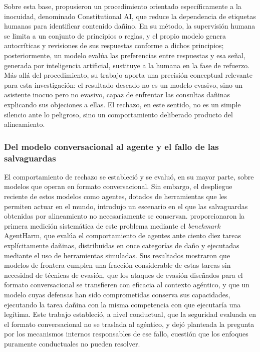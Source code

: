 Sobre esta base, \textcite{bai2022} propusieron un procedimiento orientado específicamente a la inocuidad, denominado Constitutional AI, que reduce la dependencia de etiquetas humanas para identificar contenido dañino. En su método, la supervisión humana se limita a un conjunto de principios o reglas, y el propio modelo genera autocríticas y revisiones de sus respuestas conforme a dichos principios; posteriormente, un modelo evalúa las preferencias entre respuestas y esa señal, generada por inteligencia artificial, sustituye a la humana en la fase de refuerzo. Más allá del procedimiento, su trabajo aporta una precisión conceptual relevante para esta investigación: el resultado deseado no es un modelo evasivo, sino un asistente inocuo pero no evasivo, capaz de enfrentar las consultas dañinas explicando sus objeciones a ellas. El rechazo, en este sentido, no es un simple silencio ante lo peligroso, sino un comportamiento deliberado producto del alineamiento.

\subsubsection*{Del modelo conversacional al agente y el fallo de las salvaguardas}

El comportamiento de rechazo se estableció y se evaluó, en su mayor parte, sobre modelos que operan en formato conversacional. Sin embargo, el despliegue reciente de estos modelos como agentes, dotados de herramientas que les permiten actuar en el mundo, introdujo un escenario en el que las salvaguardas obtenidas por alineamiento no necesariamente se conservan. \textcite{andriushchenko2024} proporcionaron la primera medición sistemática de este problema mediante el \textit{benchmark} AgentHarm, que evalúa el comportamiento de agentes ante ciento diez tareas explícitamente dañinas, distribuidas en once categorías de daño y ejecutadas mediante el uso de herramientas simuladas. Sus resultados mostraron que modelos de frontera cumplen una fracción considerable de estas tareas sin necesidad de técnicas de evasión, que los ataques de evasión diseñados para el formato conversacional se transfieren con eficacia al contexto agéntico, y que un modelo cuyas defensas han sido comprometidas conserva sus capacidades, ejecutando la tarea dañina con la misma competencia con que ejecutaría una legítima. Este trabajo estableció, a nivel conductual, que la seguridad evaluada en el formato conversacional no se traslada al agéntico, y dejó planteada la pregunta por los mecanismos internos responsables de ese fallo, cuestión que los enfoques puramente conductuales no pueden resolver.

